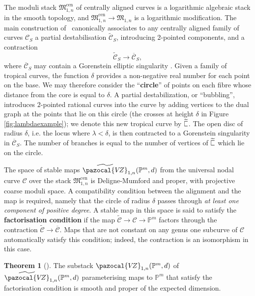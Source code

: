 \documentclass[11pt]{amsart}
\newcommand{\plC}{\scalebox{0.8}[1.3]{$\sqsubset$}}
\newcommand{\sqC}{\scalebox{0.8}[1.3]{$\sqsubset$}}
\newcommand{\PP}{\mathbb P}
\newcommand{\VZ}{\pazocal{V\!Z}}
\renewcommand{\to}{\rightarrow}
\theoremstyle{definition}
\newtheorem{thm}{Theorem}[section]
\theoremstyle{definition}
\begin{document}
The moduli stack $\mathfrak M_{1,n}^{\mathrm{cen}}$  of centrally aligned curves is a logarithmic algebraic stack in the smooth topology, and $\mathfrak M_{1,n}^{\mathrm{cen}}\to\mathfrak M_{1,n}$ is a logarithmic modification. The main construction of~\cite{RSPW} canonically associates to any centrally aligned family of curves $\mathcal C_S$ a partial destabilisation $\widetilde{\mathcal C}_S$, introducing $2$-pointed components, and a contraction
\[
\widetilde{\mathcal C}_S\to \overline{\mathcal C}_S,
\]
where $\overline{\mathcal C}_S$ may contain a Gorenstein elliptic singularity \cite{SMY1}. Given a family of tropical curves, the function $\delta$ provides a non-negative real number for each point on the base. We may therefore consider the ``\textbf{circle}'' of points on each fibre whose distance from the core is equal to $\delta$. A partial destabilization, or ``bubbling'', introduces $2$-pointed rational curves into the curve by adding vertices to the dual graph at the points that lie on this circle (the crosses at height $\delta$ in Figure \ref{fig:lambdaexample}); we denote this new tropical curve by $\widetilde{\plC}$. The open disc of radius $\delta$, i.e. the locus where $\lambda<\delta$, is then contracted to a Gorenstein singularity in $\overline{\mathcal C}_S$. The number of branches is equal to the number of vertices of $\widetilde{\sqC}$ which lie on the circle. %

The space of stable maps $\widetilde\VZ_{1,n}(\PP^m,d)$ from the universal nodal curve $\mathcal C$ over the stack $\mathfrak M_{1,n}^{\mathrm{cen}}$ is Deligne-Mumford and proper, with projective coarse moduli space. A compatibility condition between the alignment and the map is required, namely that the circle of radius $\delta$ passes through \emph{at least one component of positive degree}. A stable map in this space is said to satisfy the \textbf{factorisation condition} if the map $\widetilde{\mathcal C}\to \mathcal C\to \mathbb P^m$ factors through the contraction $\widetilde{\mathcal C}\to \overline{\mathcal C}$. Maps that are not constant on any genus one subcurve of $\mathcal C$ automatically satisfy this condition; indeed, the contraction is an isomorphism in this case.
 
\begin{thm}[{\cite[Theorem B]{RSPW}}]
The substack $\VZ_{1,n}(\mathbb P^m,d)$ of $\widetilde\VZ_{1,n}(\PP^m,d)$ parameterising maps to $\mathbb P^m$ that satisfy the factorisation condition is smooth and proper of the expected dimension.
\end{thm}
\end{document}
